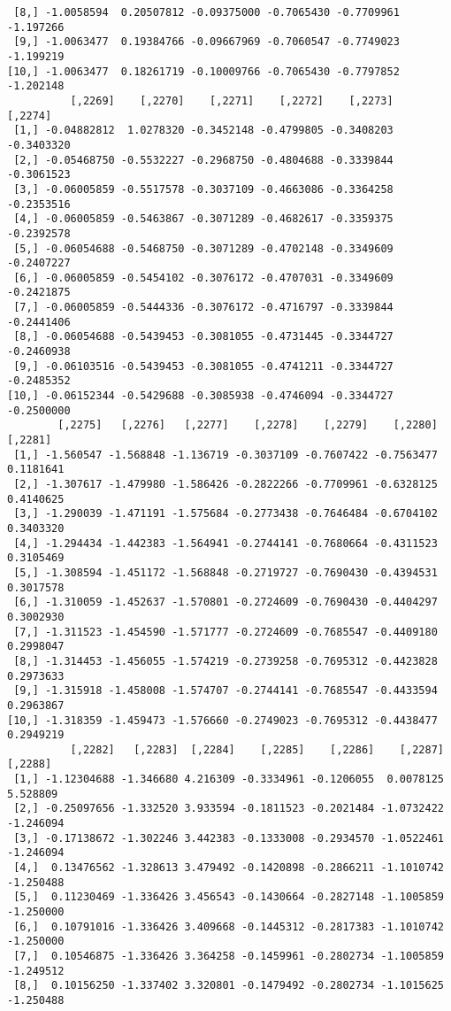 \documentclass[
  letterpaper,
  DIV=11,
  numbers=noendperiod]{scrreprt}
\begin{document}
\begin{verbatim}
 [8,] -1.0058594  0.20507812 -0.09375000 -0.7065430 -0.7709961 -1.197266
 [9,] -1.0063477  0.19384766 -0.09667969 -0.7060547 -0.7749023 -1.199219
[10,] -1.0063477  0.18261719 -0.10009766 -0.7065430 -0.7797852 -1.202148
          [,2269]    [,2270]    [,2271]    [,2272]    [,2273]    [,2274]
 [1,] -0.04882812  1.0278320 -0.3452148 -0.4799805 -0.3408203 -0.3403320
 [2,] -0.05468750 -0.5532227 -0.2968750 -0.4804688 -0.3339844 -0.3061523
 [3,] -0.06005859 -0.5517578 -0.3037109 -0.4663086 -0.3364258 -0.2353516
 [4,] -0.06005859 -0.5463867 -0.3071289 -0.4682617 -0.3359375 -0.2392578
 [5,] -0.06054688 -0.5468750 -0.3071289 -0.4702148 -0.3349609 -0.2407227
 [6,] -0.06005859 -0.5454102 -0.3076172 -0.4707031 -0.3349609 -0.2421875
 [7,] -0.06005859 -0.5444336 -0.3076172 -0.4716797 -0.3339844 -0.2441406
 [8,] -0.06054688 -0.5439453 -0.3081055 -0.4731445 -0.3344727 -0.2460938
 [9,] -0.06103516 -0.5439453 -0.3081055 -0.4741211 -0.3344727 -0.2485352
[10,] -0.06152344 -0.5429688 -0.3085938 -0.4746094 -0.3344727 -0.2500000
        [,2275]   [,2276]   [,2277]    [,2278]    [,2279]    [,2280]   [,2281]
 [1,] -1.560547 -1.568848 -1.136719 -0.3037109 -0.7607422 -0.7563477 0.1181641
 [2,] -1.307617 -1.479980 -1.586426 -0.2822266 -0.7709961 -0.6328125 0.4140625
 [3,] -1.290039 -1.471191 -1.575684 -0.2773438 -0.7646484 -0.6704102 0.3403320
 [4,] -1.294434 -1.442383 -1.564941 -0.2744141 -0.7680664 -0.4311523 0.3105469
 [5,] -1.308594 -1.451172 -1.568848 -0.2719727 -0.7690430 -0.4394531 0.3017578
 [6,] -1.310059 -1.452637 -1.570801 -0.2724609 -0.7690430 -0.4404297 0.3002930
 [7,] -1.311523 -1.454590 -1.571777 -0.2724609 -0.7685547 -0.4409180 0.2998047
 [8,] -1.314453 -1.456055 -1.574219 -0.2739258 -0.7695312 -0.4423828 0.2973633
 [9,] -1.315918 -1.458008 -1.574707 -0.2744141 -0.7685547 -0.4433594 0.2963867
[10,] -1.318359 -1.459473 -1.576660 -0.2749023 -0.7695312 -0.4438477 0.2949219
          [,2282]   [,2283]  [,2284]    [,2285]    [,2286]    [,2287]   [,2288]
 [1,] -1.12304688 -1.346680 4.216309 -0.3334961 -0.1206055  0.0078125  5.528809
 [2,] -0.25097656 -1.332520 3.933594 -0.1811523 -0.2021484 -1.0732422 -1.246094
 [3,] -0.17138672 -1.302246 3.442383 -0.1333008 -0.2934570 -1.0522461 -1.246094
 [4,]  0.13476562 -1.328613 3.479492 -0.1420898 -0.2866211 -1.1010742 -1.250488
 [5,]  0.11230469 -1.336426 3.456543 -0.1430664 -0.2827148 -1.1005859 -1.250000
 [6,]  0.10791016 -1.336426 3.409668 -0.1445312 -0.2817383 -1.1010742 -1.250000
 [7,]  0.10546875 -1.336426 3.364258 -0.1459961 -0.2802734 -1.1005859 -1.249512
 [8,]  0.10156250 -1.337402 3.320801 -0.1479492 -0.2802734 -1.1015625 -1.250488

\end{verbatim}
\end{document}
